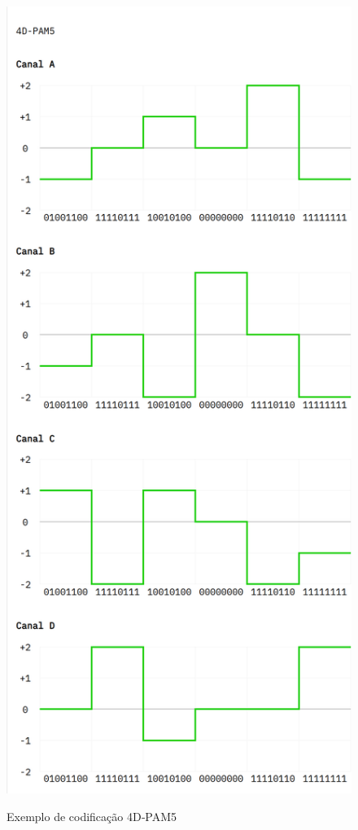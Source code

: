 \documentclass[conference]{IEEEtran}
\begin{document}
\begin{figure}[ht]
  \centering
  \caption{Exemplo de codificação 4D‑PAM5}
  \includegraphics[width=0.9\linewidth,trim={3 0 0 0},clip]{4dpam5-example.png}
  \label{fig:4D-PAM5-full-duplex}
\end{figure}
\end{document}
